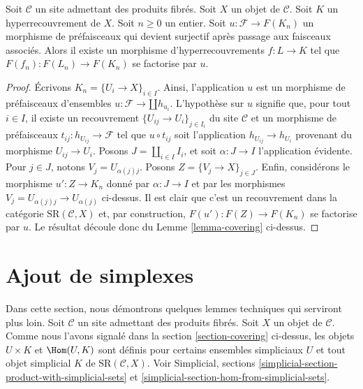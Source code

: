 \begin{lemma}
\label{lemma-covering-sheaf}
Soit $\mathcal{C}$ un site admettant des produits fibrés.
Soit $X$ un objet de $\mathcal{C}$.
Soit $K$ un hyperrecouvrement de $X$.
Soit $n \geq 0$ un entier.
Soit $u : \mathcal{F} \to F(K_n)$ un morphisme
de préfaisceaux qui devient surjectif
après passage aux faisceaux associés.
Alors il existe un morphisme d'hyperrecouvrements
$f: L \to K$ tel que $F(f_n) : F(L_n) \to F(K_n)$
se factorise par $u$.
\end{lemma}

\begin{proof}
Écrivons $K_n = \{U_i \to X\}_{i \in I}$.
Ainsi, l'application $u$ est un morphisme de préfaisceaux d'ensembles
$u : \mathcal{F} \to \amalg h_{u_i}$.
L'hypothèse sur $u$ signifie que, pour tout
$i \in I$, il existe un recouvrement $\{U_{ij} \to U_i\}_{j \in I_i}$
du site $\mathcal{C}$ et un morphisme de préfaisceaux
$t_{ij} : h_{U_{ij}} \to \mathcal{F}$ tel que
$u \circ t_{ij}$ soit l'application $h_{U_{ij}} \to h_{U_i}$
provenant du morphisme $U_{ij} \to U_i$.
Posons $J = \amalg_{i \in I} I_i$, et soit
$\alpha : J \to I$ l'application évidente.
Pour $j \in J$, notons $V_j = U_{\alpha(j)j}$. Posons
$Z = \{V_j \to X\}_{j \in J}$.
Enfin, considérons le morphisme
$u' : Z \to K_n$ donné par $\alpha : J \to I$
et par les morphismes $V_j = U_{\alpha(j)j} \to U_{\alpha(j)}$
ci-dessus. Il est clair que c'est un recouvrement dans la
catégorie $\text{SR}(\mathcal{C}, X)$ et, par
construction, $F(u') : F(Z) \to F(K_n)$ se factorise par $u$.
Le résultat découle donc du Lemme \ref{lemma-covering} ci-dessus.
\end{proof}


\section{Ajout de simplexes}
\label{section-adding-simplices}

\noindent
Dans cette section, nous démontrons quelques lemmes techniques qui serviront plus loin.
Soit $\mathcal{C}$ un site admettant des produits fibrés.
Soit $X$ un objet de $\mathcal{C}$.
Comme nous l'avons signalé dans la section \ref{section-covering} ci-dessus,
les objets $U \times K$ et $\Hom(U, K)$
sont définis pour certains ensembles simpliciaux $U$
et tout objet simplicial $K$ de $\text{SR}(\mathcal{C}, X)$.
Voir Simplicial, sections
\ref{simplicial-section-product-with-simplicial-sets} et
\ref{simplicial-section-hom-from-simplicial-sets}.

